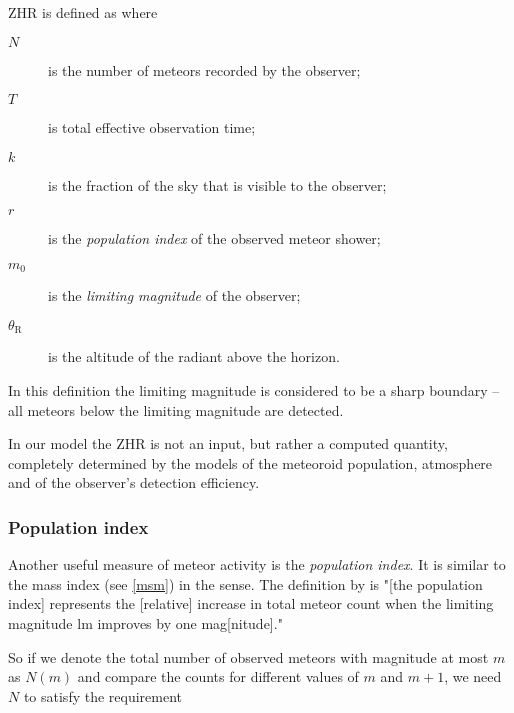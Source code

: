             ZHR is defined as
            where
            \begin{description}
                \item[$N$]
                    is the number of meteors recorded by the observer;
                \item[$T$]
                    is total effective observation time;
                \item[$k$]
                    is the fraction of the sky that is visible to the observer;
                \item[$r$]
                    is the \emph{population index} of the observed meteor shower;
                \item[$m_0$]
                    is the \emph{limiting magnitude} of the observer;
                \item[$\theta_\mathrm{R}$]
                    is the altitude of the radiant above the horizon.
            \end{description}
            In this definition the limiting magnitude is considered to be a sharp boundary -- all
            meteors below the limiting magnitude are detected.

            In our model the ZHR is not an input, but rather a computed quantity, completely determined by the
            models of the meteoroid population, atmosphere and of the observer's detection efficiency.

        \subsubsection{Population index} \label{msar}
            Another useful measure of meteor activity is the \emph{population index}.
            It is similar to the mass index (see \cref{msm}) in the sense.
            The definition by \citet{molau2015} is "[the population index] represents the [relative] increase
            in total meteor count when the limiting magnitude $\mathrm{lm}$ improves by one mag[nitude]."

            So if we denote the total number of observed meteors with magnitude at most $m$ as $N(m)$
            and compare the counts for different values of $m$ and $m + 1$, we need $N$ to satisfy the requirement

